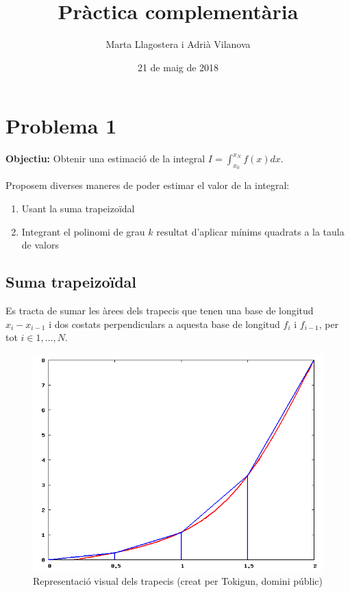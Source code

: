 \documentclass[11pt,a4paper]{article}
\author{Marta Llagostera i Adrià Vilanova\vspace{-2ex} }
\title{Pràctica complementària\vspace{-2ex}}
\date{21 de maig de 2018}
\begin{document}
\maketitle

\section{Problema 1}

\textbf{Objectiu:} Obtenir una estimació de la integral $I = \int_{x_0}^{x_N} f(x) dx$.

Proposem diverses maneres de poder estimar el valor de la integral:

\begin{enumerate}
\item Usant la suma trapeizoïdal
\item Integrant el polinomi de grau $k$ resultat d'aplicar mínims quadrats a la taula de valors
\end{enumerate}

\subsection{Suma trapeizoïdal}

Es tracta de sumar les àrees dels trapecis que tenen una base de longitud $x_i - x_{i-1}$ i dos costats perpendiculars a aquesta base de longitud $f_i$ i $f_{i-1}$, per tot $i \in {1, \ldots, N}$.

\begin{figure}[h]
\centering
\includegraphics[scale=0.5]{trap}
\caption{Representació visual dels trapecis (creat per Tokigun, domini públic)}
\end{figure}
\end{document}
